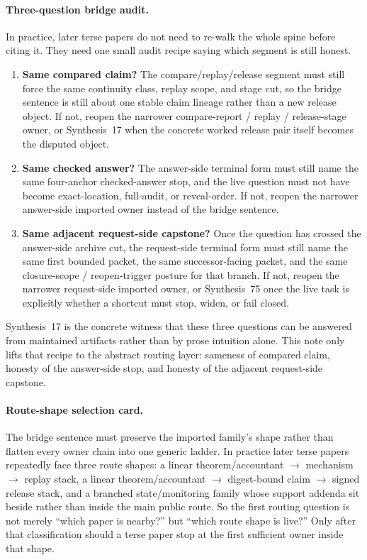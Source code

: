 \documentclass[11pt]{article}
\begin{document}
\paragraph{Three-question bridge audit.}
In practice, later terse papers do not need to re-walk the whole spine before citing it.
They need one small audit recipe saying which segment is still honest.
\begin{enumerate}[leftmargin=1.5em]
\item \textbf{Same compared claim?} The compare/replay/release segment must still force the same continuity class, replay scope, and stage cut, so the bridge sentence is still about one stable claim lineage rather than a new release object. If not, reopen the narrower compare-report / replay / release-stage owner, or Synthesis~17 when the concrete worked release pair itself becomes the disputed object.
\item \textbf{Same checked answer?} The answer-side terminal form must still name the same four-anchor checked-answer stop, and the live question must not have become exact-location, full-audit, or reveal-order. If not, reopen the narrower answer-side imported owner instead of the bridge sentence.
\item \textbf{Same adjacent request-side capstone?} Once the question has crossed the answer-side archive cut, the request-side terminal form must still name the same first bounded packet, the same successor-facing packet, and the same closure-scope / reopen-trigger posture for that branch. If not, reopen the narrower request-side imported owner, or Synthesis~75 once the live task is explicitly whether a shortcut must stop, widen, or fail closed.
\end{enumerate}
\noindent Synthesis~17 is the concrete witness that these three questions can be answered from maintained artifacts rather than by prose intuition alone.
This note only lifts that recipe to the abstract routing layer: sameness of compared claim, honesty of the answer-side stop, and honesty of the adjacent request-side capstone.


\paragraph{Route-shape selection card.}
The bridge sentence must preserve the imported family's shape rather than flatten every owner chain into one generic ladder.
In practice later terse papers repeatedly face three route shapes: a linear theorem/accountant $\to$ mechanism $\to$ replay stack, a linear theorem/accountant $\to$ digest-bound claim $\to$ signed release stack, and a branched state/monitoring family whose support addenda sit beside rather than inside the main public route.
So the first routing question is not merely ``which paper is nearby?'' but ``which route shape is live?''
Only after that classification should a terse paper stop at the first sufficient owner inside that shape.\cite{series:congestion1,series:pscq,series:wcongestion,series:mceq,series:abomoinl,series:releaseproperty,series:state1,series:state1A,series:mucc,series:state3,series:state3A}
\end{document}
